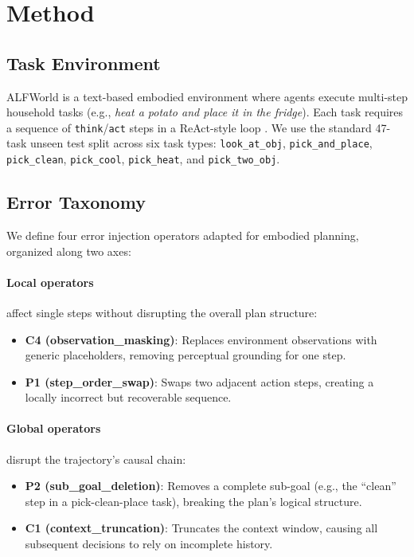 \section{Method}
\label{sec:method}

\subsection{Task Environment}
\label{sec:task_env}

ALFWorld \cite{shridhar2021alfworld} is a text-based embodied environment where agents execute multi-step household tasks (e.g., \emph{heat a potato and place it in the fridge}). Each task requires a sequence of \texttt{think}/\texttt{act} steps in a ReAct-style loop \cite{yao2023react}. We use the standard 47-task unseen test split across six task types: \texttt{look\_at\_obj}, \texttt{pick\_and\_place}, \texttt{pick\_clean}, \texttt{pick\_cool}, \texttt{pick\_heat}, and \texttt{pick\_two\_obj}.

\subsection{Error Taxonomy}
\label{sec:error_taxonomy}

We define four error injection operators adapted for embodied planning, organized along two axes:

\paragraph{Local operators} affect single steps without disrupting the overall plan structure:
\begin{itemize}[nosep,leftmargin=*]
\item \textbf{C4 (observation\_masking)}: Replaces environment observations with generic placeholders, removing perceptual grounding for one step.
\item \textbf{P1 (step\_order\_swap)}: Swaps two adjacent action steps, creating a locally incorrect but recoverable sequence.
\end{itemize}

\paragraph{Global operators} disrupt the trajectory's causal chain:
\begin{itemize}[nosep,leftmargin=*]
\item \textbf{P2 (sub\_goal\_deletion)}: Removes a complete sub-goal (e.g., the ``clean'' step in a pick-clean-place task), breaking the plan's logical structure.
\item \textbf{C1 (context\_truncation)}: Truncates the context window, causing all subsequent decisions to rely on incomplete history.
\end{itemize}

